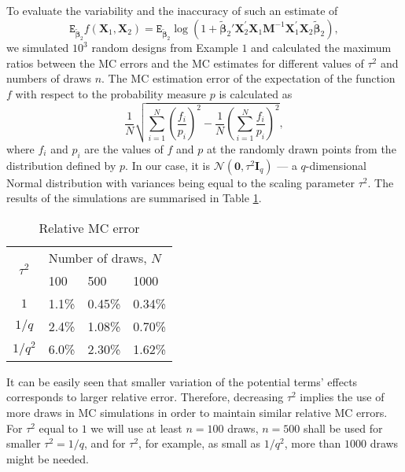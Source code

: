 To evaluate the variability and the inaccuracy of such an estimate of 
\begin{equation*}
\mathtt{E}_{\bm{\tilde{\beta}}_2}f(\bm{X}_1,\bm{X}_2)=\mathtt{E}_{\bm{\tilde{\beta}}_2}\log(1+\bm{\tilde{\beta}}_2'\bm{X}_2^{'}\bm{X}_1\bm{M}^{-1}\bm{X}_1^{'}\bm{X}_2\bm{\tilde{\beta}}_2), 
\end{equation*}
we simulated $10^3$ random designs from Example $1$ and calculated the maximum ratios between the MC errors and the MC estimates for different values of $\tau^2$ and numbers of draws $n$. The MC estimation error of the expectation of the function $f$ with respect to the probability measure $p$ is calculated as
\begin{equation*}
\frac{1}{N}\sqrt{\sum_{i=1}^{N}\left(\frac{f_i}{p_i}\right)^{2}-\frac{1}{N}\left(\sum_{i=1}^{N}\frac{f_i}{p_i}\right)^{2}},
\end{equation*}  
where $f_i$ and $p_i$ are the values of $f$ and $p$ at the randomly drawn points from the distribution defined by $p$. In our case, it is $\mathcal{N}(\bm{0},\tau^{2}\bm{I}_{q})$ --- a $q$-dimensional Normal distribution with variances being equal to the scaling parameter $\tau^2$. The results of the simulations are summarised in Table \ref{table::MC_error}.
\begin{table}[h]
\centering
\caption{Relative MC error}
\label{table::MC_error}
\begin{tabular}{|c|l|l|l|}
\hline
\multirow{2}{*}{$\tau^2$} & \multicolumn{3}{l|}{Number of draws, $N$} \\ \cline{2-4} 
  & 100     & 500     & 1000    \\ \hline
$1$ & 1.1\% & 0.45\% & 0.34\% \\ \hline
$1/q$ & 2.4\% & 1.08\% & 0.70\% \\ \hline
$1/q^2$ & 6.0\% & 2.30\% & 1.62\% \\ \hline
\end{tabular}
\end{table}
  
It can be easily seen that smaller variation of the potential terms' effects corresponds to larger relative error. Therefore, decreasing $\tau^2$ implies the use of more draws in MC simulations in order to maintain similar relative MC errors. For $\tau^2$ equal to $1$ we will use at least $n=100$ draws, $n=500$ shall be used for smaller $\tau^2=1/q$, and for $\tau^2$, for example, as small as $1/q^2$, more than $1000$ draws might be needed. 

